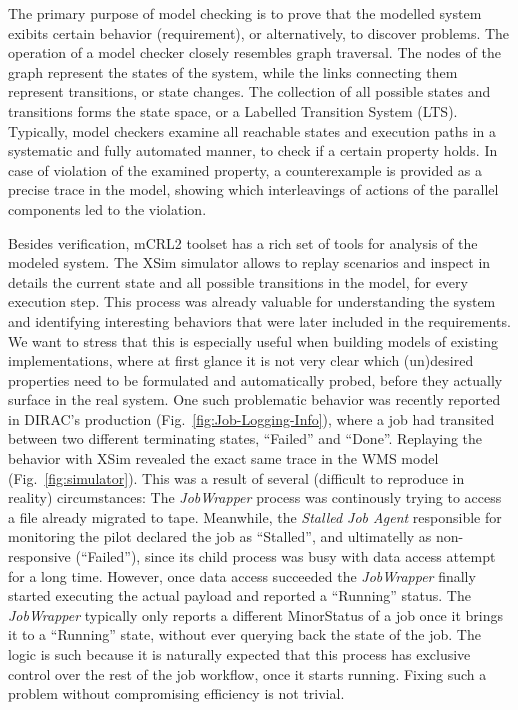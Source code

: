 \documentclass[10pt,conference]{IEEEtran}
\begin{document}
The primary purpose of model checking is to prove that the modelled system
exibits certain behavior (requirement), or alternatively, to discover problems. 
The operation of a model checker closely resembles graph traversal.
The nodes of the graph represent the states of the system, while the links
connecting them represent transitions, or state changes. The collection of 
all possible states and transitions forms the state space, or a Labelled Transition System (LTS).
Typically, model checkers
examine all reachable states and execution paths in a systematic and 
fully automated manner, to check if a certain property holds.
In case of violation of the examined property, a counterexample is 
provided as a precise trace in the model, showing which interleavings
of actions of the parallel components led to the violation.

Besides verification, mCRL2 toolset has a rich set of tools for analysis of the modeled system. 
The XSim simulator allows to replay scenarios and inspect in 
details the current state and all possible transitions in the model, for every execution step. 
This process was already valuable for understanding the
system and identifying interesting behaviors that were later included
in the requirements. We want to stress that this is especially useful
when building models of existing implementations, where at first glance it 
is not very clear which (un)desired properties need to be formulated and automatically probed,
before they actually surface in the real system.
One such problematic behavior was recently reported in DIRAC's production (Fig.~\ref{fig:Job-Logging-Info}), where
a job had transited between two different terminating states, ``Failed'' and ``Done''.
Replaying the behavior with XSim revealed the exact same trace in the WMS model (Fig.~\ref{fig:simulator}).
This was a result of several (difficult to reproduce in reality) circumstances:
The \textit{JobWrapper} process was continously trying to access a file already 
migrated to tape. Meanwhile, the \textit{Stalled Job Agent} responsible for 
monitoring the pilot declared the job as ``Stalled'', and ultimatelly as non-responsive (``Failed''),
since its child process was busy with data access attempt for a long time.
However, once data access succeeded the \textit{JobWrapper} finally started executing the 
actual payload and reported a ``Running'' status. The \textit{JobWrapper} typically
only reports a different MinorStatus of a job once it brings it to a ``Running'' state, without
ever querying back the state of the job. The logic is such
because it is naturally expected that this process has exclusive control 
over the rest of the job workflow, once it starts running. Fixing such
a problem without compromising efficiency is not trivial.
\end{document}
